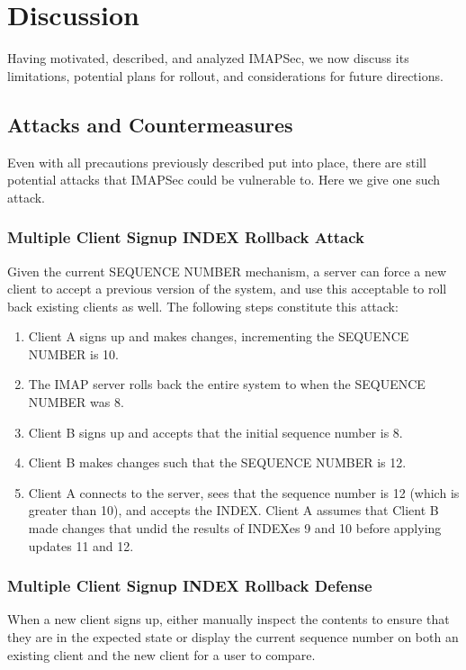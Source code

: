 \documentclass[pageno]{jpaper}
\newcommand{\project}{IMAPSec }
\newcommand{\projectnospace}{IMAPSec}
\begin{document}
\section{Discussion}

Having motivated, described, and analyzed \projectnospace, we now discuss its limitations, potential plans for rollout, and considerations for future directions.

\subsection{Attacks and Countermeasures}

Even with all precautions previously described put into place, there are still potential attacks that \project could be vulnerable to. Here we give one such attack.

\subsubsection{Multiple Client Signup INDEX Rollback Attack}

Given the current SEQUENCE NUMBER mechanism, a server can force a new client to accept a previous version of the system, and use this acceptable to roll back existing clients as well. The following steps constitute this attack:

\begin{enumerate}
\item Client A signs up and makes changes, incrementing the SEQUENCE NUMBER is 10.
\item The IMAP server rolls back the entire system to when the SEQUENCE NUMBER was 8.
\item Client B signs up and accepts that the initial sequence number is 8.
\item Client B makes changes such that the SEQUENCE NUMBER is 12.
\item Client A connects to the server, sees that the sequence number is 12 (which is greater than 10), and accepts the INDEX. Client A assumes that Client B made changes that undid the results of INDEXes 9 and 10 before applying updates 11 and 12.
\end{enumerate}

\subsubsection{Multiple Client Signup INDEX Rollback Defense}
When a new client signs up, either manually inspect the contents to ensure that they are in the expected state or display the current sequence number on both an existing client and the new client for a user to compare.
\end{document}
